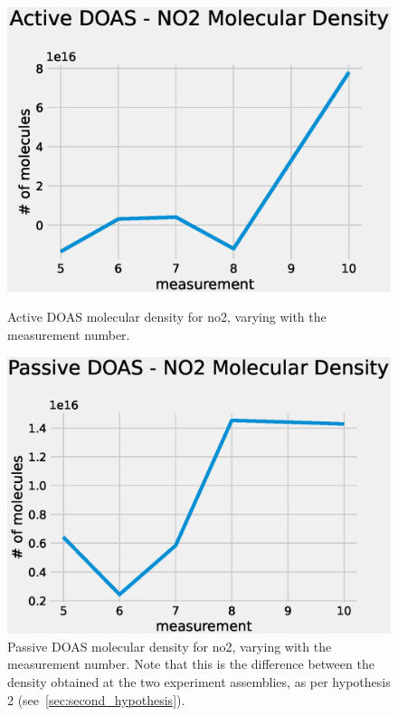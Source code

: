 \begin{figure}[htpb]
    \begin{minipage}[t]{.45\textwidth}
        \centering
        \includegraphics[width=\linewidth]{img/eps/no2_active_density.eps}
        \caption{Active \gls{DOAS} molecular density for \gls{no2}, varying
        with the measurement number.}
        \label{fig:active_densities}
    \end{minipage}
    \hfill
    \begin{minipage}[t]{.45\textwidth}
        \centering
        \includegraphics[width=\linewidth]{img/eps/no2_passive_density.eps}
        \caption{Passive \gls{DOAS} molecular density for \gls{no2}, varying
        with the measurement number. Note that this is the difference
        between the density obtained at the two experiment assemblies, as per
        hypothesis 2 (see~\ref{sec:second_hypothesis}).}
        \label{fig:passive_densities}
    \end{minipage}
\end{figure}

